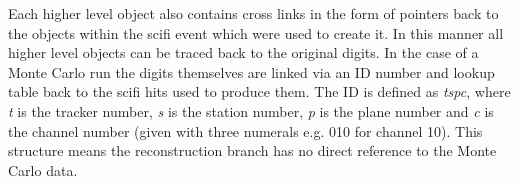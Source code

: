 Each higher level object also contains cross links in the form of pointers back to the objects within the scifi event which were used to create it. In this manner all higher level objects can be traced back to the original digits.  In the case of a Monte Carlo run the digits themselves are linked via an ID number and lookup table back to the scifi hits used to produce them. The ID is defined as \textit{tspc}, where \textit{t} is the tracker number, \textit{s} is the station number, \textit{p} is the plane number and \textit{c} is the channel number (given with three numerals e.g. 010 for channel 10).  This structure means the reconstruction branch has no direct reference to the Monte Carlo data.